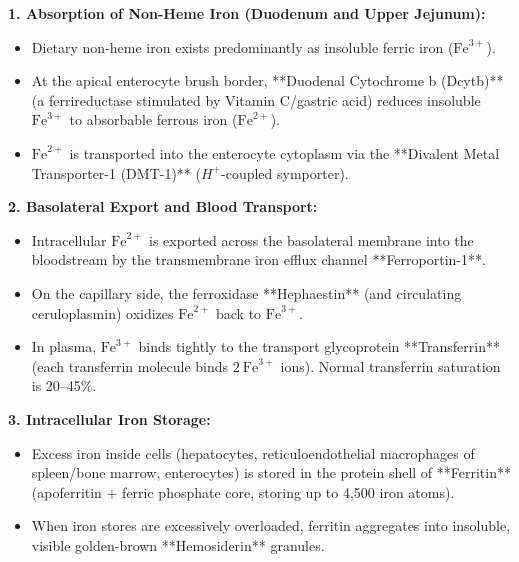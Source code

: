 \documentclass[11pt,a4paper]{article}
\begin{document}
\begin{ansbox}
\textbf{1. Absorption of Non-Heme Iron (Duodenum and Upper Jejunum):}
\begin{itemize}[leftmargin=*]
    \item Dietary non-heme iron exists predominantly as insoluble ferric iron ($\text{Fe}^{3+}$).
    \item At the apical enterocyte brush border, **Duodenal Cytochrome b (Dcytb)** (a ferrireductase stimulated by Vitamin C/gastric acid) reduces insoluble $\text{Fe}^{3+}$ to absorbable ferrous iron ($\text{Fe}^{2+}$).
    \item $\text{Fe}^{2+}$ is transported into the enterocyte cytoplasm via the **Divalent Metal Transporter-1 (DMT-1)** ($H^+$-coupled symporter).
\end{itemize}

\textbf{2. Basolateral Export and Blood Transport:}
\begin{itemize}[leftmargin=*]
    \item Intracellular $\text{Fe}^{2+}$ is exported across the basolateral membrane into the bloodstream by the transmembrane iron efflux channel **Ferroportin-1**.
    \item On the capillary side, the ferroxidase **Hephaestin** (and circulating ceruloplasmin) oxidizes $\text{Fe}^{2+}$ back to $\text{Fe}^{3+}$.
    \item In plasma, $\text{Fe}^{3+}$ binds tightly to the transport glycoprotein **Transferrin** (each transferrin molecule binds $2\ \text{Fe}^{3+}$ ions). Normal transferrin saturation is 20--45\%.
\end{itemize}

\textbf{3. Intracellular Iron Storage:}
\begin{itemize}[leftmargin=*]
    \item Excess iron inside cells (hepatocytes, reticuloendothelial macrophages of spleen/bone marrow, enterocytes) is stored in the protein shell of **Ferritin** (apoferritin + ferric phosphate core, storing up to 4,500 iron atoms).
    \item When iron stores are excessively overloaded, ferritin aggregates into insoluble, visible golden-brown **Hemosiderin** granules.
\end{itemize}


\end{ansbox}
\end{document}
